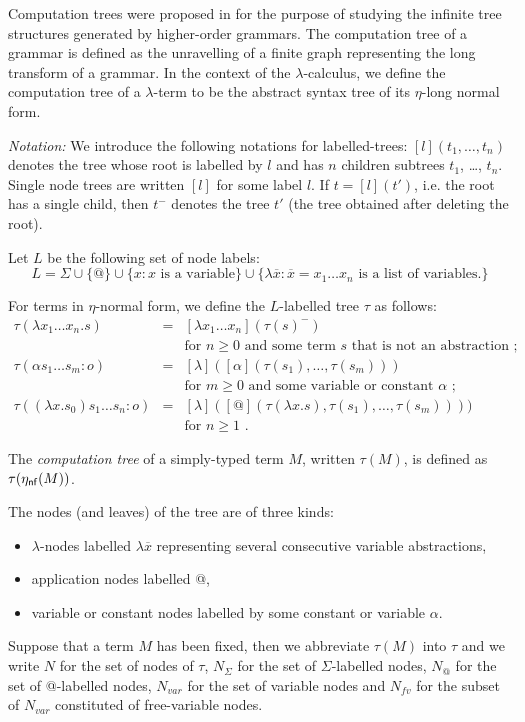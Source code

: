 \documentclass{llncs}
\newcommand\etanf[1]{\eta_{\sf nf}(#1)}
\newcommand\union{\cup}
\begin{document}
Computation trees were proposed in \cite{OngHoMchecking2006} for the purpose of studying the infinite tree structures
generated by higher-order grammars. The computation tree of a grammar is defined as the unravelling of a finite graph representing the long transform of a grammar. In the context of the $\lambda$-calculus, we define the computation tree of a $\lambda$-term to be the abstract syntax tree of its $\eta$-long normal form.

\emph{Notation:} We introduce the following notations for labelled-trees: $[l](t_1, \ldots, t_n)$ denotes the tree whose root is labelled by $l$ and has $n$ children subtrees $t_1$, \ldots, $t_n$. Single node trees are written $[l]$ for some label $l$. If $t = [l](t')$, i.e. the root has a single child, then $t^-$ denotes the tree $t'$ (the tree obtained after deleting the root).

\begin{definition}
Let $L$ be the following set of node labels:
$$ L = \Sigma \union \{ @ \} \union \{ x : x \mbox { is a variable} \}
\union \{ \lambda \overline{x} : \overline{x} = x_1 \ldots x_n \mbox { is a list of variables.} \}
  $$

For terms in $\eta$-normal form, we define the $L$-labelled tree $\tau$ as follows:
\begin{eqnarray*}
  \tau(\lambda x_1 \ldots x_n . s) &=& [\lambda x_1 \ldots x_n](\tau(s)^{-}) \\
    && \mbox{for $n\geq0$ and some term $s$ that is not an abstraction \ ;} \\
  \tau( \alpha s_1 \ldots s_m : o) &=& [ \lambda ]([\alpha](\tau(s_1),\ldots,\tau(s_m))) \\
    && \mbox{for $m\geq0$ and some variable or constant $\alpha$ \ ;} \\
  \tau((\lambda x.s_0) s_1 \ldots s_n :o) &=& [\lambda] ([@](\tau(\lambda x.s),\tau(s_1),\ldots,\tau(s_m))) ) \\
    && \mbox{for $n \geq 1$ \ .}
\end{eqnarray*}

The \emph{computation tree} of a simply-typed term $M$, written $\tau(M)$, is defined as $\tau(\etanf{M})$.
\end{definition}

The nodes (and leaves) of the tree are of three kinds:
\begin{itemize}
\item $\lambda$-nodes labelled $\lambda \overline{x}$ representing several consecutive variable abstractions,
\item application nodes labelled @,
\item variable or constant nodes labelled by some constant or variable $\alpha$.
\end{itemize}
Suppose that a term $M$ has been fixed, then we abbreviate $\tau(M)$ into $\tau$  and we write
$N$ for the set of nodes of $\tau$, $N_\Sigma$ for the set of $\Sigma$-labelled nodes,
$N_@$ for the set of @-labelled nodes, $N_{var}$ for the set of variable nodes and
$N_{fv}$ for the subset of $N_{var}$ constituted of free-variable nodes.
\end{document}
